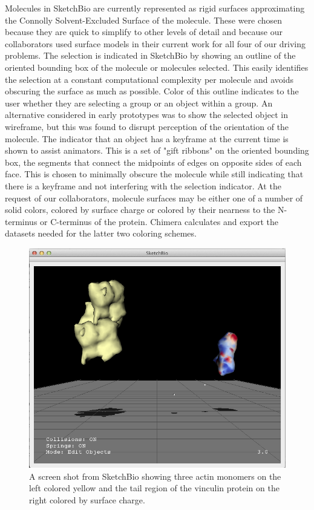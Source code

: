 \documentclass[twocolumn]{bmcart}%
\begin{document}
Molecules in SketchBio are currently represented as rigid surfaces approximating the Connolly Solvent-Excluded Surface of the molecule.
These were chosen because they are quick to simplify to other levels of detail and because our collaborators used surface models in their current work for all four of our driving problems.
The selection is indicated in SketchBio by showing an outline of the oriented bounding box of the molecule or molecules selected. 
This easily identifies the selection at a constant computational complexity per molecule and avoids obscuring the surface as much as possible.
Color of this outline indicates to the user whether they are selecting a group or an object within a group.
An alternative considered in early prototypes was to show the selected object in wireframe, but this was found to disrupt perception of the orientation of the molecule.
The indicator that an object has a keyframe at the current time is shown to assist animators.
This is a set of "gift ribbons" on the oriented bounding box, the segments that connect the midpoints of edges on opposite sides of each face.  %
This is chosen to minimally obscure the molecule while still indicating that there is a keyframe and not interfering with the selection indicator.
At the request of our collaborators, molecule surfaces may be either one of a number of solid colors, colored by surface charge or colored by their nearness to the N-terminus or C-terminus of the protein. Chimera calculates and export the datasets needed for the latter two coloring schemes.

\begin{figure}[ht]
\centering
\includegraphics[width=0.9\columnwidth]{actinVinculin.png}
\caption{A screen shot from SketchBio showing three actin monomers on the left colored yellow and the tail region of the vinculin protein on the right colored by surface charge.}
\label{fig:actin_vinculin}
\end{figure}
\end{document}
